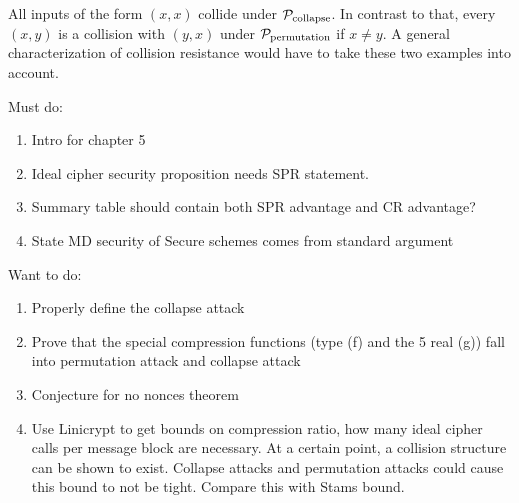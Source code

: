 All inputs of the form $(x,x)$ collide under $\P_{\mathrm{collapse}}$.
In contrast to that, every $(x,y)$ is a collision with $(y,x)$ under $\P_{\mathrm{permutation}}$ if $x \neq y$.
A general characterization of collision resistance would have to take these two examples into account.

\pagebreak

Must do:
\begin{enumerate}
\item Intro for chapter 5
\item Ideal cipher security proposition needs SPR statement.
\item Summary table should contain both SPR advantage and CR advantage?
\item State MD security of Secure schemes comes from standard argument
\end{enumerate}

Want to do:
\begin{enumerate}
\item Properly define the collapse attack
\item Prove that the special compression functions (type (f) and the 5 real (g)) fall into permutation attack and collapse attack
\item Conjecture for no nonces theorem
\item Use Linicrypt to get bounds on compression ratio, how many ideal cipher calls per message block are necessary.
At a certain point, a collision structure can be shown to exist.
Collapse attacks and permutation attacks could cause this bound to not be tight.
Compare this with Stams bound.
\end{enumerate}
